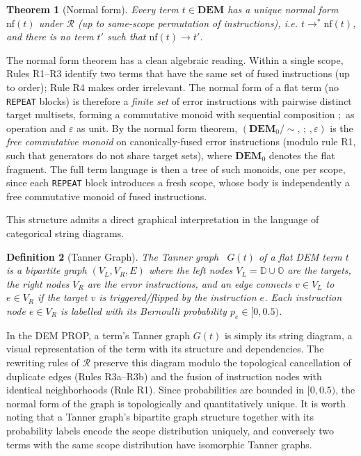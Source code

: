 \documentclass[11pt,a4paper]{article}
\newtheorem{theorem}{Theorem}
\newtheorem{definition}[theorem]{Definition}
\newcommand{\R}{\mathcal{R}}          %
\newcommand{\nf}[1]{\mathrm{nf}(#1)}  %
\newcommand{\tostep}{\to}
\newcommand{\tomany}{\to^{*}}
\begin{document}
\begin{theorem}[Normal form]
\label{thm:normalform}
Every term $t \in \mathbf{DEM}$ has a unique normal form $\nf{t}$ under $\R$ (up to same-scope permutation of instructions), i.e. $t \tomany \nf{t}$, and there is no term $t'$ such that $\nf{t} \tostep t'$. 
\end{theorem}

The normal form theorem has a clean algebraic reading. Within a single scope, Rules R1--R3 identify two terms that have the same set of fused instructions (up to order); Rule R4 makes order irrelevant. The normal form of a flat term (no \texttt{REPEAT} blocks) is therefore a \emph{finite set} of error instructions with pairwise distinct target multisets, forming a commutative monoid with sequential composition $;$ as operation and $\varepsilon$ as unit. By the normal form theorem, $(\mathbf{DEM}_0 / {\sim},\, ;\,, \varepsilon)$ is the \emph{free commutative monoid} on canonically-fused error instructions (modulo rule R1, such that generators do not share target sets), where $\mathbf{DEM}_0$ denotes the flat fragment. The full term language is then a tree of such monoids, one per scope, since each \texttt{REPEAT} block introduces a fresh scope, whose body is independently a free commutative monoid of fused instructions.

This structure admits a direct graphical interpretation in the language of categorical string diagrams.

\begin{definition}[Tanner Graph]
\label{def:tanner}
The \emph{Tanner graph}~\cite{tanner1981} $G(t)$ of a flat DEM term $t$ is a bipartite graph $(V_L, V_R, E)$ where the left nodes $V_L = \mathbb{D} \cup \mathbb{O}$ are the targets, the right nodes $V_R$ are the error instructions, and an edge connects $v \in V_L$ to $e \in V_R$ if the target $v$ is triggered/flipped by the instruction $e$. Each instruction node $e \in V_R$ is labelled with its Bernoulli probability $p_e \in [0, 0.5)$.
\end{definition}

In the DEM PROP, a term's Tanner graph $G(t)$ is simply its string diagram, a visual representation of the term with its structure and dependencies. The rewriting rules of $\R$ preserve this diagram modulo the topological cancellation of duplicate edges (Rules R3a--R3b) and the fusion of instruction nodes with identical neighborhoods (Rule R1). Since probabilities are bounded in $[0,0.5)$, the normal form of the graph is topologically and quantitatively unique. It is worth noting that a Tanner graph's bipartite graph structure together with its probability labels encode the scope distribution uniquely, and conversely two terms with the same scope distribution have isomorphic Tanner graphs.
\end{document}
